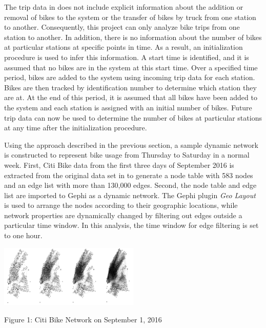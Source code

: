 \documentclass[times, 10pt,twocolumn]{article}
\begin{document}
The trip data in \cite{dataset} does not include explicit information about the addition or removal of bikes to the system or the transfer of bikes by truck from one station to another. Consequently, this project can only analyze bike trips from one station to another. In addition, there is no information about the number of bikes at particular stations at specific points in time. As a result, an initialization procedure is used to infer this information. A start time is identified, and it is assumed that no bikes are in the system at this start time. Over a specified time period, bikes are added to the system using incoming trip data for each station. Bikes are then tracked by identification number to determine which station they are at. At the end of this period, it is assumed that all bikes have been added to the system and each station is assigned with an initial number of bikes. Future trip data can now be used to determine the number of bikes at particular stations at any time after the initialization procedure.

Using the approach described in the previous section, a sample dynamic network is constructed to represent bike usage from Thursday to Saturday in a normal week. First, Citi Bike data from the first three days of September 2016 is extracted from the original data set in \cite{dataset} to generate a node table with 583 nodes and an edge list with more than 130,000 edges. Second, the node table and edge list are imported to Gephi as a dynamic network. The Gephi plugin \textit{Geo Layout} is used to arrange the nodes according to their geographic locations, while network properties are dynamically changed by filtering out edges outside a particular time window. In this analysis, the time window for edge filtering is set to one hour.\\

\centerline{\includegraphics[width=0.5\textwidth]{m2/combined.jpg}}
\centerline{Figure 1: Citi Bike Network on September 1, 2016}
\end{document}
